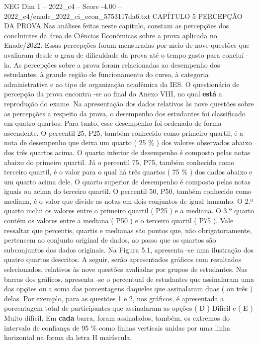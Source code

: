 \begin{textsample}{NEG Dim 1 – 2022\_c4 – Score -4.00 – 2022\_c4/enade\_2022\_ci\_econ\_5753117da6.txt}  \label{ex:f1_neg_178}
CAPÍTULO 5 PERCEPÇÃO DA PROVA Nas análises feitas neste capítulo, constam as percepções dos concluintes da área de Ciências Econômicas sobre a prova aplicada no Enade/2022.
Essas percepções foram mensuradas por meio de nove questões que avaliaram desde o grau de dificuldade da prova até o tempo gasto para concluí -la.
As percepções sobre a prova foram relacionadas ao desempenho dos estudantes, à grande região de funcionamento do curso, à categoria administrativa e ao tipo de organização acadêmica da IES.
O questionário de percepção da prova encontra -se ao final do Anexo VIII, no qual \textbf{está} a reprodução do exame.
Na apresentação dos dados relativos às nove questões sobre as percepções a respeito da prova, o desempenho dos estudantes foi classificado em quatro quartos.
Para tanto, esse desempenho foi ordenado de forma ascendente.
O percentil 25, P25, também conhecido como primeiro quartil, é a nota de desempenho que deixa um quarto ( 25 \% ) dos valores observados abaixo dos três quartos acima.
O quarto inferior de desempenho é composto pelas notas abaixo do primeiro quartil.
Já o percentil 75, P75, também conhecido como terceiro quartil, é o valor para o qual há três quartos ( 75 \% ) dos dados abaixo e um quarto acima dele.
O quarto superior de desempenho é composto pelas notas iguais ou acima do terceiro quartil.
O percentil 50, P50, também conhecido como mediana, é o valor que divide as notas em dois conjuntos de igual tamanho.
O 2.º quarto inclui os valores entre o primeiro quartil ( P25 ) e a mediana.
O 3.º quarto contém os valores entre a mediana ( P50 ) e o terceiro quartil ( P75 ).
Vale ressaltar que percentis, quartis e medianas são pontos que, não obrigatoriamente, pertencem ao conjunto original de dados, ao passo que os quartos são subconjuntos dos dados originais.
Na Figura 5.1, apresenta -se uma ilustração dos quatro quartos descritos.
A seguir, serão apresentados gráficos com resultados selecionados, relativos às nove questões avaliadas por grupos de estudantes.
Nas barras dos gráficos, apresenta -se o percentual de estudantes que assinalaram uma das opções ou a soma das porcentagens daqueles que assinalaram duas ( ou três ) delas.
Por exemplo, para as questões 1 e 2, nos gráficos, é apresentada a porcentagem total de participantes que assinalaram as opções ( D ) Difícil e ( E ) Muito difícil.
Em \textbf{cada} barra, foram assinalados, também, os extremos do intervalo de confiança de 95 \% como linhas verticais unidas por uma linha horizontal na forma da letra H maiúscula.

\end{textsample}
